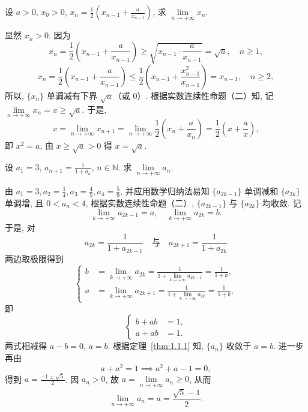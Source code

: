 \begin{example}\label{ex:1.4.5}
设 $a>0$, $x_{0}>0$, $x_{n} = \frac{1}{2}\left(x_{n-1} + \frac{a}{x_{n-1}}\right)$, 求 $\lim\limits_{n\to+\infty}x_n$.
\end{example}

\begin{solution}
显然 $x_{n}>0$. 因为
\[
x_{n} = \frac{1}{2}\left(x_{n-1} + \frac{a}{x_{n-1}}\right) \geqslant \sqrt{x_{n-1}\cdot\frac{a}{x_{n-1}}} = \sqrt{a},\quad n\geqslant1,
\]
\[
x_{n} = \frac{1}{2}\left(x_{n-1} + \frac{a}{x_{n-1}}\right) \leqslant \frac{1}{2}\left(x_{n-1} + \frac{x_{n-1}^{2}}{x_{n-1}}\right) = x_{n-1},\quad n\geqslant2,
\]
所以, $\{x_{n}\}$ 单调减有下界 $\sqrt{a}$（或 0）. 根据实数连续性命题（二）知, 记 $\lim\limits_{n\to+\infty}x_{n} = x \geqslant \sqrt{a}$. 于是,
\[
x = \lim_{n\to+\infty}x_{n+1} = \lim_{n\to+\infty}\frac{1}{2}\left(x_{n} + \frac{a}{x_{n}}\right) = \frac{1}{2}\left(x + \frac{a}{x}\right),
\]
即 $x^{2} = a$, 由 $x \geqslant \sqrt{a} > 0$ 得 $x = \sqrt{a}$.
\end{solution}

\begin{example}\label{ex:1.4.6}
设 $a_{1} = 3$, $a_{n+1} = \frac{1}{1+a_{n}}$, $n \in \mathbb{N}$. 求 $\lim\limits_{n \to +\infty} a_{n}$.
\end{example}

\begin{solution}[解法 1]
由 $a_{1} = 3, a_{2} = \frac{1}{4}, a_{3} = \frac{4}{5}, a_{4} = \frac{5}{9}$, 并应用数学归纳法易知 $\{a_{2k-1}\}$ 单调减和 $\{a_{2k}\}$ 单调增, 且 $0 < a_{n} < 4$, 根据实数连续性命题（二）, $\{a_{2k-1}\}$ 与 $\{a_{2k}\}$ 均收敛. 记
\[
\lim_{k\to+\infty}a_{2k-1} = a,\quad \lim_{k\to+\infty}a_{2k} = b.
\]
于是, 对
\[
a_{2k} = \frac{1}{1+a_{2k-1}}\quad \text{与}\quad a_{2k+1} = \frac{1}{1+a_{2k}}
\]
两边取极限得到
\[
\left\{\begin{aligned}
b &= \lim_{k\to+\infty}a_{2k} = \frac{1}{1+\lim\limits_{k\to+\infty}a_{2k-1}} = \frac{1}{1+a}, \\
a &= \lim_{k\to+\infty}a_{2k+1} = \frac{1}{1+\lim\limits_{k\to+\infty}a_{2k}} = \frac{1}{1+b},
\end{aligned}\right.
\]
即
\[
\left\{\begin{aligned}
b + ab &= 1, \\
a + ab &= 1.
\end{aligned}\right.
\]
两式相减得 $a - b = 0$, $a = b$. 根据定理~\ref{thm:1.1.1} 知, $\{a_{n}\}$ 收敛于 $a = b$. 进一步再由
\[
a + a^{2} = 1 \implies a^{2} + a - 1 = 0,
\]
得到 $a = \frac{-1\pm\sqrt{5}}{2}$. 因 $a_{n}>0$, 故 $a = \lim\limits_{n\to+\infty}a_{n}\geqslant0$, 从而
\[
\lim_{n\to+\infty}a_n = a = \frac{\sqrt{5}-1}{2}.
\]
\end{solution}

